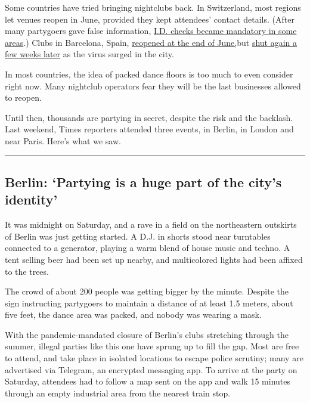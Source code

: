 Some countries have tried bringing nightclubs back. In Switzerland, most
regions let venues reopen in June, provided they kept attendees' contact
details. (After many partygoers gave false information,
\href{https://www.bazonline.ch/jetzt-kommt-die-ausweispflicht-in-clubs-und-bars-529522681267}{I.D.
checks became mandatory in some areas}.) Clubs in Barcelona, Spain,
\href{https://english.elpais.com/society/2020-06-30/barcelonas-post-covid-club-scene-empty-dance-floors-and-face-masks.html}{reopened
at the end of June,}but
\href{https://elpais.com/sociedad/2020-07-23/espana-pone-coto-al-ocio-nocturno-para-contener-el-coronavirus.html}{shut
again a few weeks later} as the virus surged in the city.

In most countries, the idea of packed dance floors is too much to even
consider right now. Many nightclub operators fear they will be the last
businesses allowed to reopen.

Until then, thousands are partying in secret, despite the risk and the
backlash. Last weekend, Times reporters attended three events, in
Berlin, in London and near Paris. Here's what we saw.

\begin{center}\rule{0.5\linewidth}{\linethickness}\end{center}

\hypertarget{berlin-partying-is-a-huge-part-of-the-citys-identity}{%
\subsection{Berlin: `Partying is a huge part of the city's
identity'}\label{berlin-partying-is-a-huge-part-of-the-citys-identity}}

It was midnight on Saturday, and a rave in a field on the northeastern
outskirts of Berlin was just getting started. A D.J. in shorts stood
near turntables connected to a generator, playing a warm blend of house
music and techno. A tent selling beer had been set up nearby, and
multicolored lights had been affixed to the trees.

The crowd of about 200 people was getting bigger by the minute. Despite
the sign instructing partygoers to maintain a distance of at least 1.5
meters, about five feet, the dance area was packed, and nobody was
wearing a mask.

With the pandemic-mandated closure of Berlin's clubs stretching through
the summer, illegal parties like this one have sprung up to fill the
gap. Most are free to attend, and take place in isolated locations to
escape police scrutiny; many are advertised via Telegram, an encrypted
messaging app. To arrive at the party on Saturday, attendees had to
follow a map sent on the app and walk 15 minutes through an empty
industrial area from the nearest train stop.

